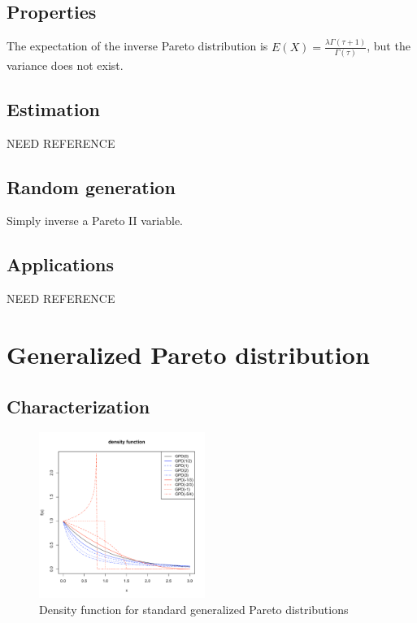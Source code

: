 \subsection{Properties}
The expectation of the inverse Pareto distribution is $E(X) = \frac{\lambda\Gamma(\tau+1)}{\Gamma(\tau)}$, but the variance does not exist.

\subsection{Estimation}
NEED REFERENCE
\subsection{Random generation}
Simply inverse a Pareto II variable.

\subsection{Applications}
NEED REFERENCE

\section{Generalized Pareto distribution}\label{GPD}
\subsection{Characterization}
\begin{figure}
  \vspace{-50pt}
  \begin{center}
    \includegraphics[width=0.48\textwidth]{img/gpdzoom}
  \end{center}
  \vspace{-20pt}  
  \caption{Density function for standard generalized Pareto distributions}
  \vspace{-20pt}  
\end{figure}

